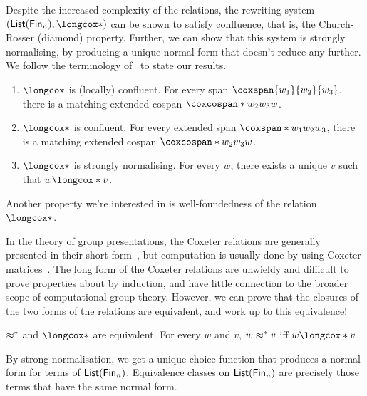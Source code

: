 Despite the increased complexity of the relations, the rewriting system $(\List[\Fin[n]],\longcox*)$ can be shown to
satisfy confluence, that is, the Church-Rosser (diamond) property. Further, we can show that this system is strongly
normalising, by producing a unique normal form that doesn't reduce any further. We follow the terminology
of~\cite{krausCoherenceWellFoundednessTaming2020} to state our results.

\begin{proposition}
  \leavevmode
  \begin{enumerate}
    \item $\longcox$ is (locally) confluent. For every span $\coxspan{w_{1}}{w_{2}}{w_{3}}$, there is a matching
          extended cospan $\coxcospan*{w_{2}}{w_{3}}{w}$.
    \item $\longcox*$ is confluent. For every extended span $\coxspan*{w_{1}}{w_{2}}{w_{3}}$, there is a matching
          extended cospan $\coxcospan*{w_{2}}{w_{3}}{w}$.
    \item $\longcox*$ is strongly normalising. For every $w$, there exists a unique $v$ such that $w \longcox* v$.
  \end{enumerate}
\end{proposition}

Another property we're interested in is well-foundedness of the relation $\longcox*$.

In the theory of group presentations, the Coxeter relations are generally presented in their short form~,
but computation is usually done by using Coxeter matrices~\cite{davisGeometryTopologyCoxeter2008}. The long form of the
Coxeter relations are unwieldy and difficult to prove properties about by induction, and have little connection to the
broader scope of computational group theory. However, we can prove that the closures of the two forms of the relations
are equivalent, and work up to this equivalence!

\begin{proposition}
  $\cox*$ and $\longcox*$ are equivalent. For every $w$ and $v$, $w \cox* v$ iff $w \longcox* v$.
\end{proposition}

By strong normalisation, we get a unique choice function that produces a normal form for terms of $\List[\Fin[n]]$.
Equivalence classes on $\List[\Fin[n]]$ are precisely those terms that have the same normal form.

